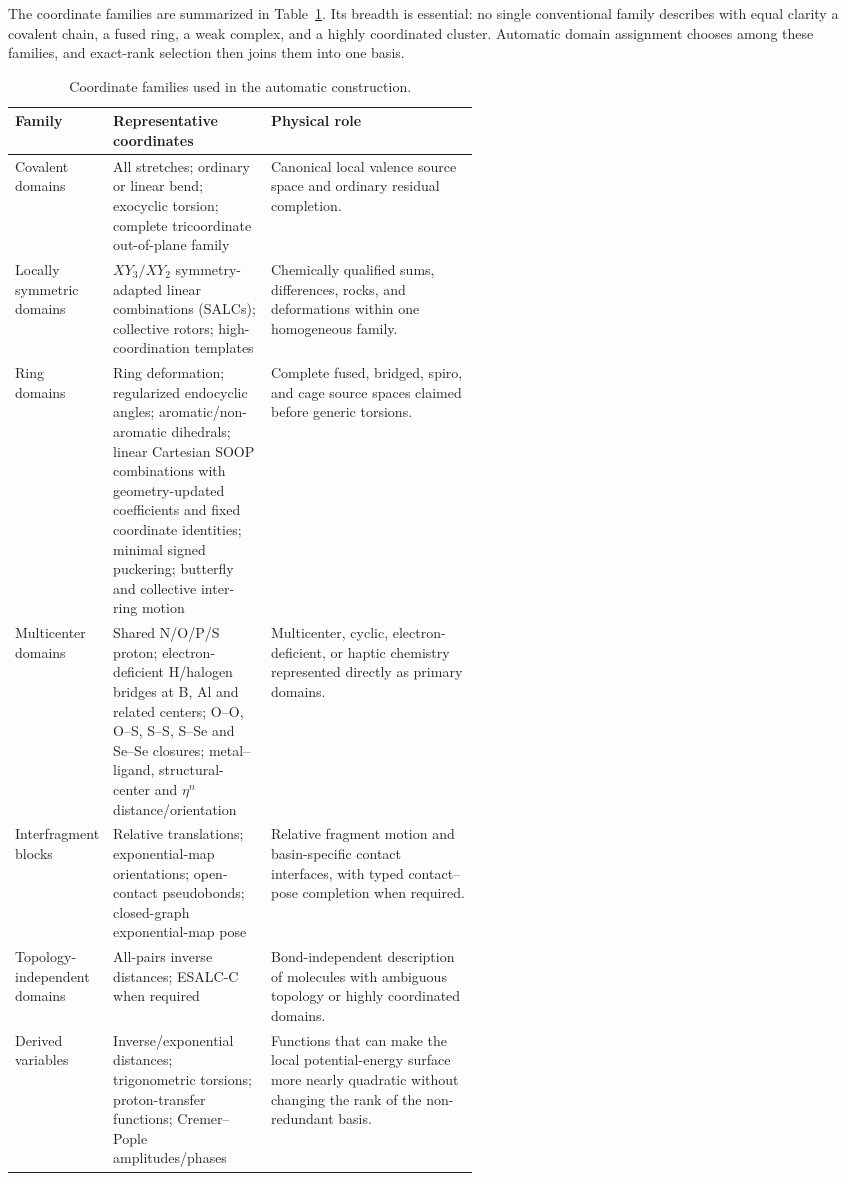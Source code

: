 \documentclass[journal=jctcce,manuscript=article,layout=traditional]{achemso}
\theoremstyle{definition}
\begin{document}
The coordinate families are summarized in Table~\ref{tab:coordinate-types}.
Its breadth is essential: no single conventional family describes with equal
clarity a covalent chain, a fused ring, a weak complex, and a highly
coordinated cluster.  Automatic domain assignment chooses among these families,
and exact-rank selection then joins them into one basis.

\begin{table}[htbp]
\centering
\scriptsize
\setlength{\tabcolsep}{3pt}
\caption{Coordinate families used in the automatic construction.}
\label{tab:coordinate-types}
\begin{tabularx}{\linewidth}{@{}>{\raggedright\arraybackslash}p{0.20\linewidth}
>{\raggedright\arraybackslash}p{0.34\linewidth}
>{\raggedright\arraybackslash}X@{}}
\toprule
Family & Representative coordinates & Physical role \\
\midrule
Covalent domains & All stretches; ordinary or linear bend; exocyclic torsion;
complete tricoordinate out-of-plane family & Canonical local valence source
space and ordinary residual completion. \\
\midrule
Locally symmetric domains & \(XY_3/XY_2\) symmetry-adapted linear combinations
(SALCs); collective rotors;
high-coordination templates & Chemically qualified sums, differences, rocks,
and deformations within one homogeneous family. \\
\midrule
Ring domains & Ring deformation; regularized endocyclic angles;
aromatic/non-aromatic dihedrals; linear Cartesian SOOP combinations with
geometry-updated coefficients and fixed coordinate identities; minimal signed puckering;
butterfly and collective inter-ring motion & Complete fused, bridged, spiro,
and cage source spaces claimed before generic torsions. \\
\midrule
Multicenter domains & Shared N/O/P/S proton; electron-deficient H/halogen
bridges at B, Al and related centers; O--O, O--S, S--S, S--Se and Se--Se
closures; metal--ligand, structural-center and \(\eta^n\) distance/orientation & Multicenter,
cyclic, electron-deficient, or haptic chemistry represented directly as primary
domains. \\
\midrule
Interfragment blocks & Relative translations; exponential-map orientations;
open-contact pseudobonds; closed-graph exponential-map pose & Relative fragment
motion and basin-specific contact interfaces, with typed contact--pose
completion when required. \\
\midrule
Topology-independent domains & All-pairs inverse distances; ESALC-C when required & Bond-independent description of
molecules with ambiguous topology or highly coordinated domains. \\
\midrule
Derived variables & Inverse/exponential distances; trigonometric torsions;
proton-transfer functions; Cremer--Pople amplitudes/phases & Functions that can
make the local potential-energy surface more nearly quadratic without changing
the rank of the non-redundant basis. \\
\bottomrule
\end{tabularx}
\end{table}
\end{document}
